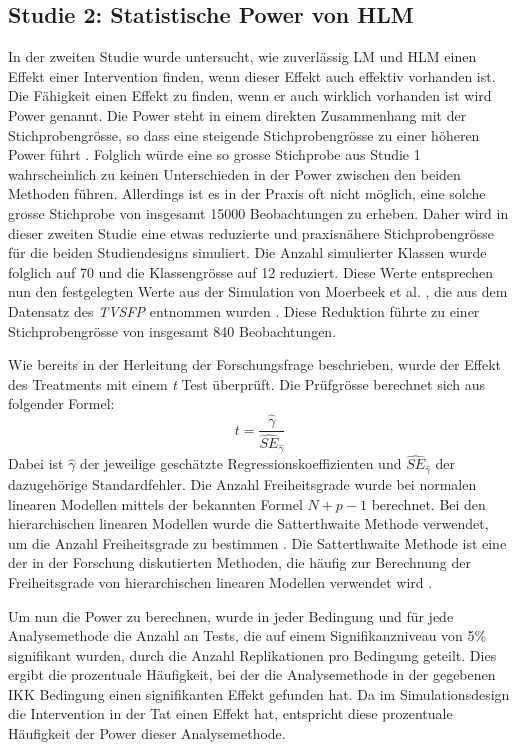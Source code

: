 \documentclass[12pt]{article}\usepackage[]{graphicx}\usepackage[]{color}
\begin{document}
\subsection{Studie 2: Statistische Power von HLM}
In der zweiten Studie wurde untersucht, wie zuverlässig LM und HLM einen Effekt einer Intervention finden, wenn dieser Effekt auch effektiv vorhanden ist. Die Fähigkeit einen Effekt zu finden, wenn er auch wirklich vorhanden ist wird Power genannt. Die Power steht in einem direkten Zusammenhang mit der Stichprobengrösse, so dass eine steigende Stichprobengrösse zu einer höheren Power führt \citep{snijders2005samplesizepower}. Folglich würde eine so grosse Stichprobe aus Studie 1 wahrscheinlich zu keinen Unterschieden in der Power zwischen den beiden Methoden führen. Allerdings ist es in der Praxis oft nicht möglich, eine solche grosse Stichprobe von insgesamt 15000 Beobachtungen zu erheben. Daher wird in dieser zweiten Studie eine etwas reduzierte und praxisnähere Stichprobengrösse für die beiden Studiendesigns simuliert. Die Anzahl simulierter Klassen wurde folglich auf 70 und die Klassengrösse auf 12 reduziert. Diese Werte entsprechen nun  den festgelegten Werte aus der Simulation von Moerbeek et al. \citeyearpar{MOERBEEK2003341}, die aus dem Datensatz des \textit{TVSFP} entnommen wurden \citep{FLAY1995smoking}. Diese Reduktion führte zu einer Stichprobengrösse von insgesamt 840 Beobachtungen. 

Wie bereits in der Herleitung der Forschungsfrage beschrieben, wurde der Effekt des Treatments mit einem \textit{t} Test überprüft. Die Prüfgrösse berechnet sich aus folgender Formel:
\begin{equation}
t = \dfrac{\widehat{\gamma}}{\widehat{SE}_{\widehat{\gamma}}}
\end{equation}
Dabei ist $\widehat{\gamma}$ der jeweilige geschätzte Regressionskoeffizienten und $\widehat{SE}_{\widehat{\gamma}}$ der dazugehörige Standardfehler. Die Anzahl Freiheitsgrade wurde bei normalen linearen Modellen mittels der bekannten Formel $N + p - 1$ berechnet. Bei den hierarchischen linearen Modellen wurde die Satterthwaite Methode verwendet, um die Anzahl Freiheitsgrade zu bestimmen \citeyearpar{satter1941synthesis}. Die Satterthwaite Methode ist eine der in der Forschung diskutierten Methoden, die häufig zur Berechnung der Freiheitsgrade von hierarchischen linearen Modellen verwendet wird \citep{raudenbush2002hierarchical,SnijdersTomA.B2012Ma:a}. 

Um nun die Power zu berechnen, wurde in jeder Bedingung und für jede Analysemethode die Anzahl an Tests, die auf einem Signifikanzniveau von 5\% signifikant wurden, durch die Anzahl Replikationen pro Bedingung geteilt. Dies ergibt die prozentuale Häufigkeit, bei der die Analysemethode in der gegebenen IKK Bedingung einen signifikanten Effekt gefunden hat. Da im Simulationsdesign die Intervention in der Tat einen Effekt hat, entspricht diese prozentuale Häufigkeit der Power dieser Analysemethode.
\end{document}
